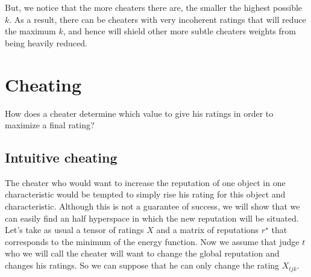 \documentclass[12pt,a4paper]{article}
\begin{document}
But, we notice that the more cheaters there are, the smaller the highest possible $k$. As a result, there can be cheaters with very incoherent ratings that will reduce the maximum $k$, and hence will shield other more subtle cheaters weights from being heavily reduced.
\section{Cheating}
How does a cheater determine which value to give his ratings in order to maximize a final rating? 
\subsection{Intuitive cheating}

The cheater who would want to increase the reputation of one object in one characteristic would be tempted to simply rise his rating for this object and characteristic. Although this is not a guarantee of success, we will show that we can easily find an half hyperspace in which the new reputation will be situated.\\

Let's take as usual a tensor of ratings $X$ and a matrix of reputations $r^{\star}$ that corresponds to the minimum of the energy function. Now we assume that judge $t$ who we will call the cheater will want to change the global reputation and changes his ratings. So we can suppose that he can only change the rating $X_{tjk}$. 
\end{document}
